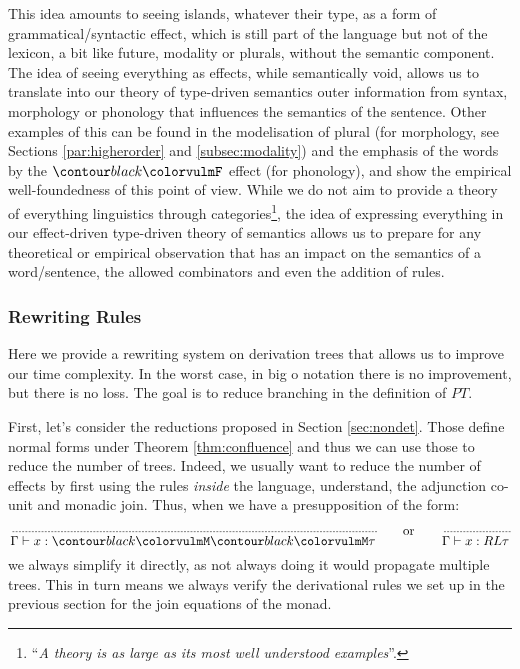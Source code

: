 This idea amounts to seeing islands, whatever their type, as a form of grammatical/syntactic effect, which is
still part of the language but not of the lexicon, a bit like future, modality or plurals, without the semantic
component.
The idea of seeing everything as effects, while semantically void, allows us to translate into our theory of
type-driven semantics outer information from syntax, morphology or phonology that influences the semantics of the
sentence.
Other examples of this can be found in the modelisation of plural (for morphology, see Sections \ref{par:higherorder}
and \ref{subsec:modality}) and the emphasis of the words by the $\f{F}$ effect (for phonology), and show the
empirical well-foundedness of this point of view.
While we do not aim to provide a theory of everything linguistics through categories\footnote{``\emph{A theory is as
		large as its most well understood examples}''.}, the idea of expressing everything in our effect-driven type-driven
theory of semantics allows us to prepare for any theoretical or empirical observation that has an impact on the
semantics of a word/sentence, the allowed combinators and even the addition of rules.

\subsubsection{Rewriting Rules}
\label{subsec:rewrite}
Here we provide a rewriting system on derivation trees that allows us to improve our time complexity.
In the worst case, in big o notation there is no improvement, but there is no loss.
The goal is to reduce branching in the definition of $PT$.

\medskip

First, let's consider the reductions proposed in Section \ref{sec:nondet}.
Those define normal forms under Theorem \ref{thm:confluence} and thus we can use those to reduce the number
of trees.
Indeed, we usually want to reduce the number of effects by first using the rules \emph{inside} the language,
understand, the adjunction co-unit and monadic join.
Thus, when we have a presupposition of the form:
\begin{equation*}
	\suppfrac{\blank}{\cont x: \f{M}\f{M}\tau} \poulpe \text{or} \poulpe \suppfrac{\blank}{\cont x: RL\tau}
\end{equation*}
we always simplify it directly, as not always doing it would propagate multiple trees.
This in turn means we always verify the derivational rules we set up in the previous section for the join
equations of the monad.

